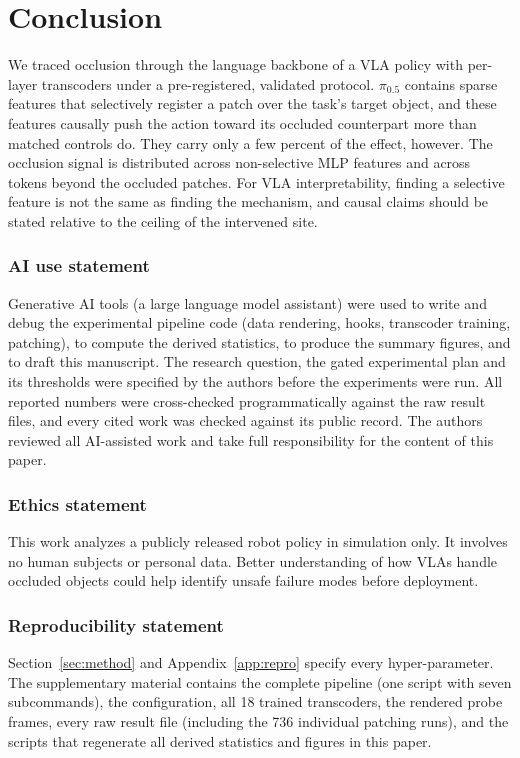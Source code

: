 \documentclass{article} %
\newcommand{\pifive}{$\pi_{0.5}$}
\begin{document}
\section{Conclusion}
We traced occlusion through the language backbone of a VLA policy with per-layer transcoders under a pre-registered, validated protocol. \pifive{} contains sparse features that selectively register a patch over the task's target object, and these features causally push the action toward its occluded counterpart more than matched controls do. They carry only a few percent of the effect, however. The occlusion signal is distributed across non-selective MLP features and across tokens beyond the occluded patches. For VLA interpretability, finding a selective feature is not the same as finding the mechanism, and causal claims should be stated relative to the ceiling of the intervened site.

\subsubsection*{AI use statement}
Generative AI tools (a large language model assistant) were used to write and debug the experimental pipeline code (data rendering, hooks, transcoder training, patching), to compute the derived statistics, to produce the summary figures, and to draft this manuscript. The research question, the gated experimental plan and its thresholds were specified by the authors before the experiments were run. All reported numbers were cross-checked programmatically against the raw result files, and every cited work was checked against its public record. The authors reviewed all AI-assisted work and take full responsibility for the content of this paper.

\subsubsection*{Ethics statement}
This work analyzes a publicly released robot policy in simulation only. It involves no human subjects or personal data. Better understanding of how VLAs handle occluded objects could help identify unsafe failure modes before deployment.

\subsubsection*{Reproducibility statement}
Section~\ref{sec:method} and Appendix~\ref{app:repro} specify every hyper-parameter. The supplementary material contains the complete pipeline (one script with seven subcommands), the configuration, all 18 trained transcoders, the rendered probe frames, every raw result file (including the 736 individual patching runs), and the scripts that regenerate all derived statistics and figures in this paper.
\end{document}
